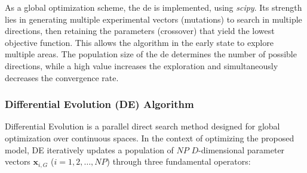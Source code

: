 As a global optimization scheme, the \ac{de} is implemented, using \textit{scipy}. Its strength lies in generating multiple experimental vectors (mutations) to search in multiple directions, then retaining the parameters (crossover) that yield the lowest objective function. This allows the algorithm in the early state to explore multiple areas. The population size of the \ac{de} determines the number of possible directions, while a high value increases the exploration and simultaneously decreases the convergence rate.

\subsubsection{Differential Evolution (DE) Algorithm}
\cite{journals/jgo/StornP97}
Differential Evolution is a parallel direct search method designed for global optimization over continuous spaces. In the context of optimizing the proposed model, DE iteratively updates a population of $NP$ $D$-dimensional parameter vectors $\mathbf{x}_{i,G}$ ($i=1, 2, \dots, NP$) through three fundamental operators:

